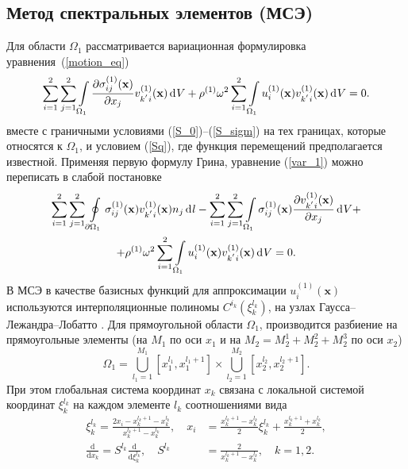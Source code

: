 \documentclass[press]{vestnik}
\begin{document}
	\subsection{Метод спектральных элементов (МСЭ)}
Для области $\Omega_{1}$ рассматривается вариационная формулировка уравнения~(\ref{motion_eq})
\begin{equation} \label{var_1}
	\sum_{i=1}^{2} \sum_{j=1}^{2} \int\limits_{\Omega_1} 
	\frac{\partial \sigma_{ij}^{(1)}(\bm{x}) }{\partial x_{j} } v_{k^{'}i}^{(1)}(\bm{x}) \d V + \rho^{(1)} \omega^{2} \sum_{i=1}^{2} \int\limits_{\Omega_1} u_{i}^{(1)}(\bm{x}) v_{k^{'}i}^{(1)}(\bm{x}) \d V = 0.
\end{equation}
вместе с граничными условиями (\ref{S_0})–(\ref{S_sigm}) на тех границах, которые относятся к $\Omega_{1}$, и условием (\ref{Sq}), где функция перемещений предполагается известной. Применяя первую формулу Грина, уравнение (\ref{var_1}) можно переписать в слабой постановке
\begin{multline} \label{weak_form1}
	\sum_{i=1}^{2} \sum_{j=1}^{2} \oint\limits_{\partial \Omega_1} \sigma_{ij}^{(1)}(\bm{x}) v_{k^{'}i}^{(1)}(\bm{x}) n_{j} \d l - \sum_{i=1}^{2} \sum_{j=1}^{2} \int\limits_{\Omega_1} \sigma_{ij}^{(1)}(\bm{x}) \frac{\partial v_{k^{'}i}^{(1)}(\bm{x}) }{\partial x_{j} } \d V + 
	\\
	+\rho^{(1)} \omega^{2} \sum_{i=1}^{2} \int\limits_{\Omega_1} u_{i}^{(1)}(\bm{x}) v_{k^{'}i}^{(1)}(\bm{x}) \d V = 0.
\end{multline}
В МСЭ в качестве базисных функций для аппроксимации $u_{i}^{(1)}({\bm{x}})$ используются интерполяционные полиномы $C^{i_{k}} (\xi_{k}^{l_{k}})$,   на узлах Гаусса--Лежандра--Лобатто \cite{Golub_2015}. Для прямоугольной области $\Omega_{1}$, производится разбиение на прямоугольные элементы (на $M_{1}$ по оси $x_{1}$ и на $M_{2}=M_{2}^{1}+M_{2}^{2}+M_{2}^{3}$ по оси $x_{2}$)
$$
\Omega_{1}=\bigcup_{l_{1}=1}^{M_{1}} [x_{1}^{l_{1}}, x_{1}^{l_{1}+1}] \times \bigcup_{l_{2}=1}^{M_{2}} [x_{2}^{l_{2}}, x_{2}^{l_{2}+1}].
$$
При этом глобальная система координат $x_{k}$ связана с локальной системой координат $\xi_{k}^{l_{k}}$ на каждом элементе $l_{k}$ соотношениями вида
\begin{equation*}
	\begin{split}
		\xi_{k}^{l_k} = \frac{2 x_i - x_{k}^{l_k + 1} -x_{k}^{l_k}}{x_{k}^{l_k + 1} -x_{k}^{l_k}},\quad x_i &= \frac{x_{k}^{l_k + 1} -x_{k}^{l_k}}{2} \xi_{k}^{l_k} + \frac{x_{k}^{l_k + 1} + x_{k}^{l_k}}{2},	\\
		\frac{\text{d}}{\text{d} x_k} = S^{l_k} \frac{\text{d}}{\text{d} \xi_{k}^{l_k}},\quad S^{l_k} &= \frac{2}{x_{k}^{l_k + 1} -x_{k}^{l_k}},\quad k=1,2.
	\end{split}
\end{equation*}
\end{document}
